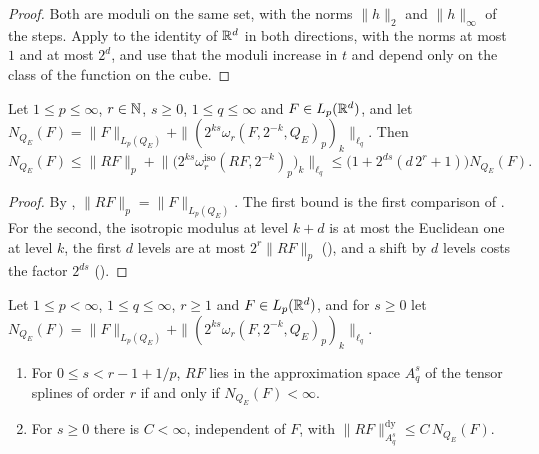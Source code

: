 \begin{proof}
\leanok
{}
Both are moduli on the same set, with the norms $\|h\|_2$ and $\|h\|_\infty$ of the steps. Apply
 to the identity of $\mathbb{R}^d$ in both directions, with the norms
at most $1$ and at most $2^d$, and use that the moduli increase in $t$ and depend only on the
class of the function on the cube.
\end{proof}

\begin{proposition}
\label{prop:euclidean-cube-norms}
\leanok
{}
Let $1 \leq p \leq \infty$, $r \in \mathbb{N}$, $s \geq 0$, $1 \leq q \leq \infty$ and
$F \in L_p(\mathbb{R}^d)$, and let
$N_{Q_E}(F) = \|F\|_{L_p(Q_E)} + \|(2^{ks} \omega_r(F, 2^{-k}, Q_E)_p)_k\|_{\ell_q}$. Then
\[
  N_{Q_E}(F) \leq \|R F\|_p
    + \bigl\|\bigl(2^{ks} \omega^{\mathrm{iso}}_r(R F, 2^{-k})_p\bigr)_k\bigr\|_{\ell_q}
  \leq \bigl(1 + 2^{ds} (d \, 2^r + 1)\bigr) N_{Q_E}(F) .
\]
\end{proposition}

\begin{proof}
\leanok
{}
By , $\|R F\|_p = \|F\|_{L_p(Q_E)}$. The first bound is the
first comparison of . For the second, the isotropic modulus at
level $k + d$ is at most the Euclidean one at level $k$, the first $d$ levels are at most
$2^r \|R F\|_p$ (), and a shift by $d$ levels costs the factor $2^{ds}$
().
\end{proof}

\begin{theorem}
\label{thm:cube-splines-euclidean}
\leanok
{}
Let $1 \leq p < \infty$, $1 \leq q \leq \infty$, $r \geq 1$ and $F \in L_p(\mathbb{R}^d)$, and for
$s \geq 0$ let
$N_{Q_E}(F) = \|F\|_{L_p(Q_E)} + \|(2^{ks} \omega_r(F, 2^{-k}, Q_E)_p)_k\|_{\ell_q}$.
\begin{enumerate}
  \item For $0 \leq s < r - 1 + 1/p$, $R F$ lies in the approximation space $A^s_q$ of the
    tensor splines of order $r$ if and only if $N_{Q_E}(F) < \infty$.
  \item For $s \geq 0$ there is $C < \infty$, independent of $F$, with
    $\|R F\|^{\mathrm{dy}}_{A^s_q} \leq C \, N_{Q_E}(F)$.
\end{enumerate}
\end{theorem}

